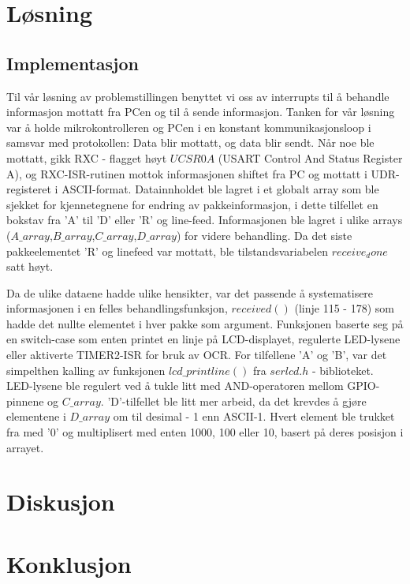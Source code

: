 \documentclass[11pt, a4paper]{report}
\begin{document}
\section{Løsning}


\subsection{Implementasjon}
Til vår løsning av problemstillingen benyttet vi oss av interrupts til å behandle informasjon mottatt fra PCen og til å sende informasjon. Tanken for vår løsning var å holde mikrokontrolleren og PCen i en konstant kommunikasjonsloop i samsvar med protokollen: Data blir mottatt, og data blir sendt. Når noe ble mottatt, gikk RXC - flagget høyt $UCSR0A$ (USART Control And Status Register A), og RXC-ISR-rutinen mottok informasjonen shiftet fra PC og mottatt i UDR-registeret i ASCII-format. Datainnholdet ble lagret i et globalt array som ble sjekket for kjennetegnene for endring av pakkeinformasjon, i dette tilfellet en bokstav fra 'A' til 'D' eller 'R' og line-feed. Informasjonen ble lagret i ulike arrays ($A\_array$,$B\_array$,$C\_array$,$D\_array$) for videre behandling. Da det siste pakkeelementet 'R' og linefeed var mottatt, ble tilstandsvariabelen $receive_done$ satt høyt.

Da de ulike dataene hadde ulike hensikter, var det passende å systematisere informasjonen i en felles behandlingsfunksjon, $received()$ (linje 115 - 178) som hadde det nullte elementet i hver pakke som argument. Funksjonen baserte seg på en switch-case som enten printet en linje på LCD-displayet, regulerte LED-lysene eller aktiverte TIMER2-ISR for bruk av OCR. For tilfellene 'A' og 'B', var det simpelthen kalling av funksjonen $lcd\_printline()$ fra $serlcd.h$ - biblioteket. LED-lysene ble regulert ved å tukle litt med AND-operatoren mellom GPIO-pinnene og $C\_array$. 'D'-tilfellet ble litt mer arbeid, da det krevdes å gjøre elementene i $D\_array$ om til desimal - 1 enn ASCII-1. Hvert element ble trukket fra med '0' og multiplisert med enten 1000, 100 eller 10, basert på deres posisjon i arrayet. 

\section{Diskusjon}

\section{Konklusjon}

\end{document}
